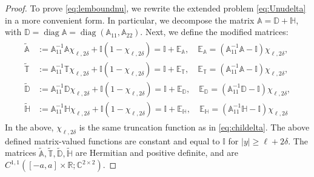 \documentclass[10pt,a4paper]{amsart}
\renewcommand{\vec}[1]{\mathbf{#1}}
\begin{document}
\begin{proof}
To prove \eqref{eq:lemboundnu}, we rewrite the extended problem \eqref{eq:Unudelta} in a more convenient form. In particular, we decompose the matrix $\mathbb{A}=\mathbb{D}+\mathbb{H}$, with $\mathbb{D}=\operatorname{diag}\mathbb{A}=\operatorname{diag}(\mathbb{A}_{11}, \mathbb{A}_{22})$. Next, we define the modified matrices:
\begin{align}
	\label{eq:ptilde}
	\begin{split}
		\widetilde{\mathbb{A}}&:=\mathbb{A}_{11}^{-1}\mathbb{A}\chi_{\ell,2\delta}+\mathbb{I}(1-\chi_{\ell,2\delta})=\mathbb{I}+\mathbb{E}_{\mathbb{A}}, \quad \mathbb{E}_{\mathbb{A}}=(\mathbb{A}_{11}^{-1}\mathbb{A}-\mathbb{I})\chi_{\ell,2\delta},\\
		\widetilde{\mathbb{T}}&:=\mathbb{A}_{11}^{-1}\mathbb{T}\chi_{\ell,2\delta}+\mathbb{I}(1-\chi_{\ell,2\delta})=\mathbb{I}+\mathbb{E}_{\mathbb{T}}, \quad \mathbb{E}_{\mathbb{T}}=(\mathbb{A}_{11}^{-1}\mathbb{A}-\mathbb{I})\chi_{\ell,2\delta},\\
		\widetilde{\mathbb{D}}&:=\mathbb{A}_{11}^{-1}\mathbb{D}\chi_{\ell,2\delta}+\mathbb{I}(1-\chi_{\ell,2\delta})=\mathbb{I}+\mathbb{E}_{\mathbb{D}}, \quad \mathbb{E}_{\mathbb{D}}=(\mathbb{A}_{11}^{-1}\mathbb{D}-\mathbb{I})\chi_{\ell,2\delta}, \\
		\widetilde{\mathbb{H}}&:=\mathbb{A}_{11}^{-1}\mathbb{H}\chi_{\ell,2\delta}+\mathbb{I}(1-\chi_{\ell,2\delta})=\mathbb{I}+\mathbb{E}_{\mathbb{H}}, \quad \mathbb{E}_{\mathbb{H}}=(\mathbb{A}_{11}^{-1}\mathbb{H}-\mathbb{I})\chi_{\ell,2\delta}
	\end{split}
\end{align}  
In the above, $\chi_{\ell,2\delta}$ is the same truncation function as in \eqref{eq:childelta}. The above defined matrix-valued functions are constant and equal to $\mathbb{I}$ for $|y|\geq \ell+2\delta$. The matrices $\widetilde{\mathbb{A}}, \widetilde{\mathbb{T}}, \widetilde{\mathbb{D}}, \widetilde{\mathbb{H}}$ are Hermitian and positive definite, and are $C^{1,1}([-a,a]\times \mathbb{R}; \mathbb{C}^{2\times 2})$. 

\end{proof}
\end{document}
